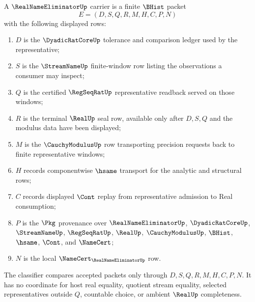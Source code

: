 \begin{definition}
\label{def:real-name-eliminator-carrier}
A $\RealNameEliminatorUp$ carrier is a finite $\BHist$ packet
$$
E=(D,S,Q,R,M,H,C,P,N)
$$
with the following displayed rows:
\begin{enumerate}
\item $D$ is the $\DyadicRatCoreUp$ tolerance and comparison ledger used by the representative;
\item $S$ is the $\StreamNameUp$ finite-window row listing the observations a consumer may inspect;
\item $Q$ is the certified $\RegSeqRatUp$ representative readback served on those windows;
\item $R$ is the terminal $\RealUp$ seal row, available only after $D,S,Q$ and the modulus data have been displayed;
\item $M$ is the $\CauchyModulusUp$ row transporting precision requests back to finite representative windows;
\item $H$ records componentwise $\hsame$ transport for the analytic and structural rows;
\item $C$ records displayed $\Cont$ replay from representative admission to Real consumption;
\item $P$ is the $\Pkg$ provenance over $\RealNameEliminatorUp$, $\DyadicRatCoreUp$, $\StreamNameUp$, $\RegSeqRatUp$, $\RealUp$, $\CauchyModulusUp$, $\BHist$, $\hsame$, $\Cont$, and $\NameCert$;
\item $N$ is the local $\NameCert_{\RealNameEliminatorUp}$ row.
\end{enumerate}
The classifier compares accepted packets only through $D,S,Q,R,M,H,C,P,N$. It has no coordinate for host real equality, quotient stream equality, selected representatives outside $Q$, countable choice, or ambient $\RealUp$ completeness.
\end{definition}

